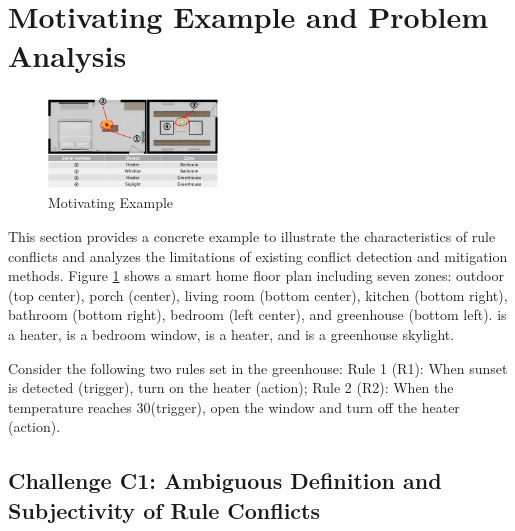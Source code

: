 \section{Motivating Example and Problem Analysis}


\begin{figure}[htbp]
	\centering
	\includegraphics[width=0.4\textwidth]{figure/motivated_example.png}
	\caption{Motivating Example}
	\label{motivated_example}
\end{figure}

This section provides a concrete example to illustrate the characteristics of rule conflicts and analyzes the limitations of existing conflict detection and mitigation methods. Figure \ref{motivated_example} shows a smart home floor plan including seven zones: outdoor (top center), porch (center), living room (bottom center), kitchen (bottom right), bathroom (bottom right), bedroom (left center), and greenhouse (bottom left).  is a heater,  is a bedroom window,  is a heater, and  is a greenhouse skylight.

Consider the following two rules set in the greenhouse: Rule 1 (R1): When sunset is detected (trigger), turn on the heater (action); Rule 2 (R2): When the temperature reaches 30\celsius (trigger), open the window and turn off the heater (action).

\subsection{Challenge C1: Ambiguous Definition and Subjectivity of Rule Conflicts}


